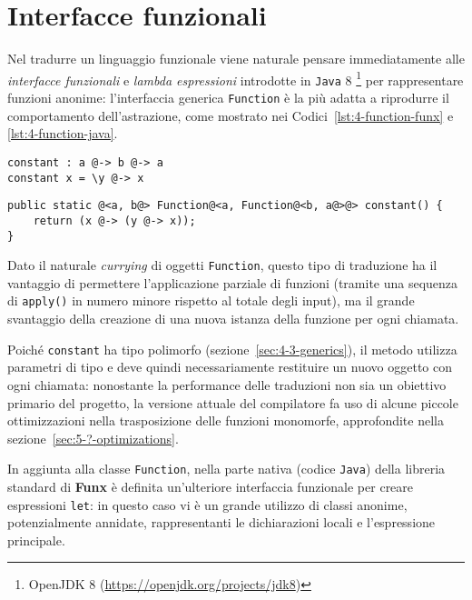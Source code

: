 \section{Interfacce funzionali}
\label{sec:4-1-functional-interfaces}

Nel tradurre un linguaggio funzionale viene naturale pensare immediatamente alle \textit{interfacce funzionali} e \textit{lambda espressioni}
introdotte in \texttt{Java} 8%
\footnote{OpenJDK 8 (\url{https://openjdk.org/projects/jdk8})}
per rappresentare funzioni anonime: l'interfaccia generica \texttt{Function} è la più adatta a riprodurre
il comportamento dell'astrazione, come mostrato nei Codici~\ref{lst:4-function-funx} e \ref{lst:4-function-java}.

\vspace{4mm}
\begin{lstlisting}[caption={Semplice funzione in \textbf{Funx}}, style=funxCode, label={lst:4-function-funx}]
constant : a @-> b @-> a
constant x = \y @-> x
\end{lstlisting}
\vspace{4mm}
\begin{lstlisting}[caption={Corrispondente metodo in \texttt{Java}}, style=javaCode, label={lst:4-function-java}]
public static @<a, b@> Function@<a, Function@<b, a@>@> constant() {
    return (x @-> (y @-> x));
}
\end{lstlisting}
\vspace{4mm}

\noindent Dato il naturale \textit{currying} di oggetti \texttt{Function}, questo tipo di traduzione ha il vantaggio
di permettere l'applicazione parziale di funzioni (tramite una sequenza di \texttt{apply()} in numero minore rispetto al totale degli input),
ma il grande svantaggio della creazione di una nuova istanza della funzione per ogni chiamata.


Poiché \texttt{constant} ha tipo polimorfo (sezione~\ref{sec:4-3-generics}), il metodo utilizza parametri di tipo
e deve quindi necessariamente restituire un nuovo oggetto con ogni chiamata:
nonostante la performance delle traduzioni non sia un obiettivo primario del progetto, la versione attuale
del compilatore fa uso di alcune piccole ottimizzazioni nella trasposizione delle funzioni monomorfe,
approfondite nella sezione~\ref{sec:5-?-optimizations}.

\newpage

\noindent In aggiunta alla classe \texttt{Function}, nella parte nativa (codice \texttt{Java}) della libreria standard
di \textbf{Funx} è definita un'ulteriore interfaccia funzionale per creare espressioni \texttt{let}:
in questo caso vi è un grande utilizzo di classi anonime, potenzialmente annidate,
rappresentanti le dichiarazioni locali e l'espressione principale.

